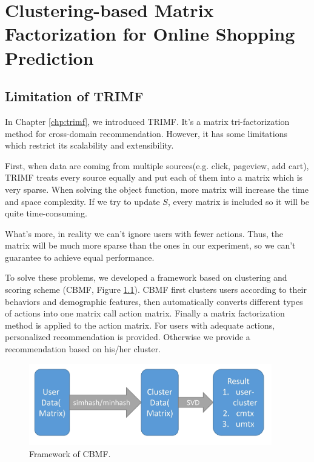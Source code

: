 ﻿\chapter{Clustering-based Matrix Factorization for Online Shopping Prediction}
\label{chp:cbmf}
\section{Limitation of TRIMF}
In Chapter \ref{chp:trimf}, we introduced TRIMF. It's a matrix tri-factorization method for cross-domain recommendation. However, it has some limitations which restrict its scalability and extensibility.

First, when data are coming from multiple sources(e.g. click, pageview, add cart), TRIMF treats every source equally and put each of them into a matrix which is very sparse. When solving the object function, more matrix will increase the time and space complexity. If we try to update $S$, every matrix is included so it will be quite time-consuming.

What's more, in reality we can't ignore users with fewer actions. Thus, the matrix will be much more sparse than the ones in our experiment, so we can't guarantee to achieve equal performance.

To solve these problems, we developed a framework based on clustering and scoring scheme (CBMF, Figure \ref{fig:cbmf}). CBMF first clusters users according to their behaviors and demographic features, then automatically converts different types of actions into one matrix call action matrix. Finally a matrix factorization method is applied to the action matrix. For users with adequate actions, personalized recommendation is provided. Otherwise we provide a recommendation based on his/her cluster.

\begin{figure}


\begin{center}
\includegraphics[width=400px]{fig/d} 
\caption{Framework of CBMF.}
\label{fig:cbmf}
\end{center}
\end{figure}





